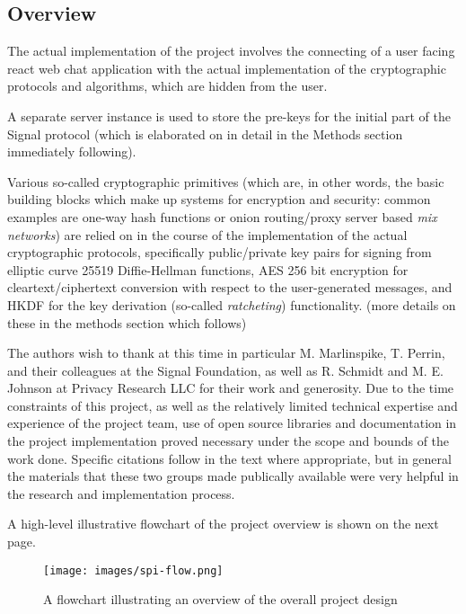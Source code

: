 \documentclass[12pt]{article}
\begin{document}
\subsection{Overview}
The actual implementation of the project involves the connecting of a user facing react web chat application with the actual implementation of the cryptographic protocols and algorithms, which are hidden from the user.
\par A separate server instance is used to store the pre-keys for the initial part of the Signal protocol (which is elaborated on in detail in the Methods section immediately following). 
\par Various so-called cryptographic primitives (which are, in other words, the basic building blocks which make up systems for encryption and security: common examples are one-way hash functions or onion routing/proxy server based \textit{mix networks}) are relied on in the course of the implementation of the actual cryptographic protocols, specifically public/private key pairs for signing from elliptic curve 25519 Diffie-Hellman functions, AES 256 bit encryption for cleartext/ciphertext conversion with respect to the user-generated messages, and HKDF for the key derivation (so-called \textit{ratcheting}) functionality. (more details on these in the methods section which follows)
\par The authors wish to thank at this time in particular M. Marlinspike, T. Perrin, and their colleagues at the Signal Foundation\parencite{website:sigfound}, as well as R. Schmidt and M. E. Johnson at Privacy Research LLC \parencite{website:prllc} for their work and generosity. Due to the time constraints of this project, as well as the relatively limited technical expertise and experience of the project team, use of open source libraries and documentation in the project implementation proved necessary under the scope and bounds of the work done. Specific citations follow in the text where appropriate, but in general the materials that these two groups made publically available were very helpful in the research and implementation process. \parencite{website:signal-docs}\parencite{website:prggh}\parencite{website:siglibjavascript}\parencite{website:prglibsigtypescript}\parencite{website:prglibsigdemo}
\par A high-level illustrative flowchart of the project overview is shown on the next page.

\begin{figure}[h!]
    \centering
    \texttt{[image: images/spi-flow.png]}
    \caption{A flowchart illustrating an overview of the overall project design}
    \label{fig:my_label1}
\end{figure}
\end{document}
